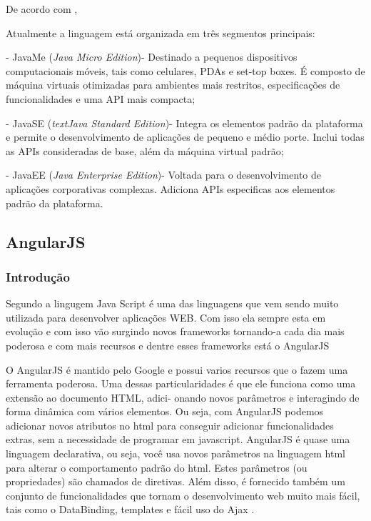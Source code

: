 \par De acordo com , 

\begin{citacao} Atualmente a linguagem está organizada em três segmentos
principais:


	- JavaMe (\textit{Java Micro Edition})- Destinado a pequenos dispositivos
	computacionais móveis, tais como celulares, PDAs e set-top boxes. É composto de máquina virtuais otimizadas para ambientes mais restritos, especificações de 
funcionalidades e uma API mais compacta; 
	  
	- JavaSE (\textit{textJava Standard Edition})- Integra os elementos padrão
	da plataforma e permite o desenvolvimento de aplicações de pequeno e médio porte. Inclui todas as APIs consideradas de base,
além da máquina virtual padrão;

	- JavaEE (\textit{Java Enterprise Edition})- Voltada para o desenvolvimento
	de aplicações corporativas complexas. Adiciona APIs especificas aos elementos padrão da plataforma.
	

\end{citacao}

\subsection{AngularJS}

\subsubsection{Introdução}

\par Segundo  a lingugem Java Script
é uma das linguagens que vem sendo muito utilizada para desenvolver aplicações WEB. Com isso ela sempre esta em evolução e com isso
vão surgindo novos frameworks tornando-a cada dia mais poderosa e com mais
recursos e dentre esses frameworks está o AngularJS

\par O AngularJS é mantido pelo Google e possui varios recursos que o fazem uma
ferramenta poderosa.
Uma dessas particularidades é que ele funciona como uma extensão ao documento HTML, adici-
onando novos parâmetros e interagindo de forma dinâmica com vários elementos. Ou seja, com
AngularJS podemos adicionar novos atributos no html para conseguir adicionar funcionalidades
extras, sem a necessidade de programar em javascript.
AngularJS é quase uma linguagem declarativa, ou seja, você usa novos parâmetros na linguagem
html para alterar o comportamento padrão do html. Estes parâmetros (ou propriedades) são
chamados de diretivas.
Além disso, é fornecido também um conjunto de funcionalidades que tornam o desenvolvimento
web muito mais fácil, tais como o DataBinding, templates e fácil uso do Ajax
\cite{livro_java_Guia_do_Programador}.


